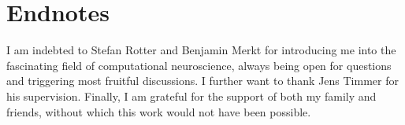 \chapter{Endnotes}
\label{sec:endnotes}
I am indebted to Stefan Rotter and Benjamin Merkt for introducing 
me into the fascinating field of computational neuroscience, always
being open for questions and triggering most fruitful discussions. I further want
to thank Jens Timmer for his supervision. Finally, I am grateful for the support 
of both my family and friends, without which this work would not have been possible.

